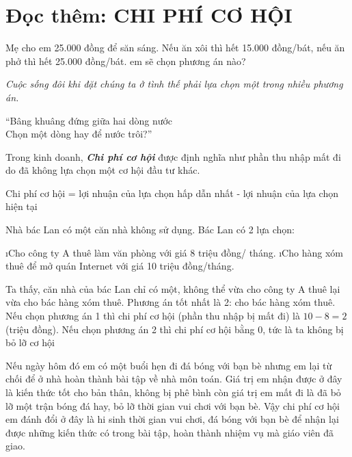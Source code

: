 \section{Đọc thêm: CHI PHÍ CƠ HỘI}
Mẹ cho em 25.000 đồng để săn sáng. Nếu ăn xôi thì hết 15.000 đồng/bát, nếu ăn phở thì hết 25.000 đồng/bát. em sẽ chọn phương án nào?

\textit{Cuộc sống đôi khi đặt chúng ta ở tình thế phải lựa chọn một trong nhiều phương án.}
\begin{center}
	“Bâng khuâng đứng giữa hai dòng nước\\
Chọn một dòng hay để nước trôi?”
\end{center}
Trong kinh doanh, \textbf{\textit{Chi phí cơ hội}} được định nghĩa như phần thu nhập mất đi do đã không lựa chọn một cơ hội đầu tư khác.
\begin{center}
	Chi phí cơ hội = lợi nhuận của lựa chọn hấp dẫn nhất - lợi nhuận của lựa chọn hiện tại
\end{center}
\begin{vd}
	Nhà bác Lan có một căn nhà không sử dụng. Bác Lan có 2 lựa chọn:
	\begin{enumerate}[1.,leftmargin=*]
		\i Cho công ty A thuê làm văn phòng với giá 8 triệu đồng/ tháng.
		\i Cho hàng xóm thuê để mở quán Internet với giá 10 triệu đồng/tháng.
	\end{enumerate}
	Ta thấy, căn nhà của bác Lan chỉ có một, không thể vừa cho công ty A thuê lại vừa cho bác hàng xóm thuê. Phương án tốt nhất là 2: cho bác hàng xóm thuê.
	Nếu chọn phương án 1 thì chi phí cơ hội (phần thu nhập bị mất đi) là $10-8=2$ (triệu đồng).
	Nếu chọn phương án 2 thì chi phí cơ hội bằng 0, tức là ta không bị bỏ lỡ cơ hội
\end{vd}
\begin{vd}
	Nếu ngày hôm đó em có một buổi hẹn đi đá bóng với bạn bè nhưng em lại từ chối để ở nhà hoàn thành bài tập về nhà môn toán. Giá trị em nhận được ở đây là kiến thức tốt cho bản thân, không bị phê bình còn giá trị em mất đi là đã bỏ lỡ một trận bóng đá hay, bỏ lỡ thời gian vui chơi với bạn bè. Vậy chi phí cơ hội em đánh đổi ở đây là hi sinh thời gian vui chơi, đá bóng với bạn bè để nhận lại được những kiến thức có trong bài tập, hoàn thành nhiệm vụ mà giáo viên đã giao.
\end{vd}